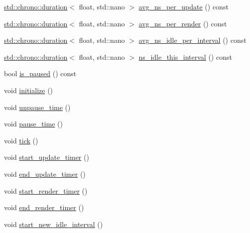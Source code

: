 \begin{DoxyCompactItemize}
\hyperlink{_game_timer_8hpp_ab009df19aad3a6ab5be3c7e2f740f737_ab009df19aad3a6ab5be3c7e2f740f737}{std\+::chrono\+::duration}$<$ float, std\+::nano $>$ \hyperlink{class_game_timer_a488f57ea227be64ccc03b9c70b1d6a43_a488f57ea227be64ccc03b9c70b1d6a43}{avg\+\_\+ns\+\_\+per\+\_\+update} () const 
\item 
\hyperlink{_game_timer_8hpp_ab009df19aad3a6ab5be3c7e2f740f737_ab009df19aad3a6ab5be3c7e2f740f737}{std\+::chrono\+::duration}$<$ float, std\+::nano $>$ \hyperlink{class_game_timer_a1ec9b2368e11e63c48fdfa2965b9e88c_a1ec9b2368e11e63c48fdfa2965b9e88c}{avg\+\_\+ns\+\_\+per\+\_\+render} () const 
\item 
\hyperlink{_game_timer_8hpp_ab009df19aad3a6ab5be3c7e2f740f737_ab009df19aad3a6ab5be3c7e2f740f737}{std\+::chrono\+::duration}$<$ float, std\+::nano $>$ \hyperlink{class_game_timer_a46db6a1cc03e89eac25db2296767f067_a46db6a1cc03e89eac25db2296767f067}{avg\+\_\+ns\+\_\+idle\+\_\+per\+\_\+interval} () const 
\item 
\hyperlink{_game_timer_8hpp_ab009df19aad3a6ab5be3c7e2f740f737_ab009df19aad3a6ab5be3c7e2f740f737}{std\+::chrono\+::duration}$<$ float, std\+::nano $>$ \hyperlink{class_game_timer_a46c0437f60c22411b55f31c8637e4827_a46c0437f60c22411b55f31c8637e4827}{ns\+\_\+idle\+\_\+this\+\_\+interval} () const 
\item 
bool \hyperlink{class_game_timer_a2fba57083e2609aa005a99042365b001_a2fba57083e2609aa005a99042365b001}{is\+\_\+paused} () const 
\item 
void \hyperlink{class_game_timer_a86cb497fa9b732ca55fda03062f34891_a86cb497fa9b732ca55fda03062f34891}{initialize} ()
\item 
void \hyperlink{class_game_timer_a1ce0ff591ad01b4aaeb4f28eb8a146ee_a1ce0ff591ad01b4aaeb4f28eb8a146ee}{unpause\+\_\+time} ()
\item 
void \hyperlink{class_game_timer_a8bcaac2f847f9a839eca50e72a37bc5d_a8bcaac2f847f9a839eca50e72a37bc5d}{pause\+\_\+time} ()
\item 
void \hyperlink{class_game_timer_a20aa18e5ab02ae786083c131107afe32_a20aa18e5ab02ae786083c131107afe32}{tick} ()
\item 
void \hyperlink{class_game_timer_af514830a6ca1b8c03a270fd687a372c1_af514830a6ca1b8c03a270fd687a372c1}{start\+\_\+update\+\_\+timer} ()
\item 
void \hyperlink{class_game_timer_a2cb06cea96bd5a0b5a9b422e129a8901_a2cb06cea96bd5a0b5a9b422e129a8901}{end\+\_\+update\+\_\+timer} ()
\item 
void \hyperlink{class_game_timer_a1de3e26ef16c57ad3f435afb4c82109a_a1de3e26ef16c57ad3f435afb4c82109a}{start\+\_\+render\+\_\+timer} ()
\item 
void \hyperlink{class_game_timer_af170c5bfe99ef9b566487cde8e7ce153_af170c5bfe99ef9b566487cde8e7ce153}{end\+\_\+render\+\_\+timer} ()
\item 
void \hyperlink{class_game_timer_ac5652aa7cc3c54c24b8a2e5429f7a102_ac5652aa7cc3c54c24b8a2e5429f7a102}{start\+\_\+new\+\_\+idle\+\_\+interval} ()
\end{DoxyCompactItemize}


